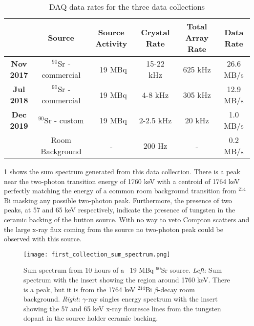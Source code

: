 \documentclass[cnatzke_thesis_proposal.tex]{subfiles}
\begin{document}
\begin{table}[]
  \centering
  \begin{tabular}{cccccc}
                    & Source                  & Source Activity & Crystal Rate & Total Array Rate & Data Rate \\ \hline
  \textbf{Nov 2017} & $^{90}$Sr - commercial  & ~19 MBq         & 15-22 kHz    & 625 kHz          & 26.6 MB/s \\ \hline
  \textbf{Jul 2018} & $^{90}$Sr - commercial  & ~19 MBq         & 4-8 kHz      & 305 kHz          & 12.9 MB/s \\ \hline
  \textbf{Dec 2019} & $^{90}$Sr - custom      & ~19 MBq         & 2-2.5 kHz    & 20 kHz           & 1.0 MB/s  \\
                    & Room Background         & -               & 200 Hz       & -                & 0.2 MB/s  \\ \hline
  \end{tabular}
  \caption{DAQ data rates for the three data collections}
  \label{tab:daq_rates}
\end{table}

\ref{fig:sum_spectrum_jul2017} shows the sum spectrum generated from this data collection.
There is a peak near the two-photon transition energy of 1760 keV with a centroid of 1764 keV perfectly matching the energy of a common room background transition from $^{214}$Bi masking any possible two-photon peak.
Furthermore, the presence of two peaks, at 57 and 65 keV respectively, indicate the presence of tungsten in the ceramic backing of the button source.
With no way to veto Compton scatters and the large x-ray flux coming from the source no two-photon peak could be observed with this source.

\begin{figure}[htbp]
  \centering
  \texttt{[image: first\_collection\_sum\_spectrum.png]}
  \caption{Sum spectrum from 10 hours of a ~19 MBq $^{90}$Sr source.
    \textit{Left:} Sum spectrum with the insert showing the region around 1760 keV. There is a peak, but it is from the 1764 keV $^{214}$Bi $\beta$-decay room background.
    \textit{Right:} $\gamma$-ray singles energy spectrum with the insert showing the 57 and 65 keV x-ray flouresce lines from the tungsten dopant in the source holder ceramic backing.
  }
  \label{fig:sum_spectrum_jul2017}
\end{figure}

\end{document}

